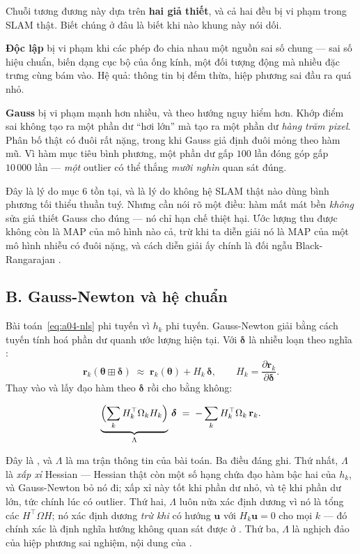 \documentclass[../../vslam.tex]{subfiles}
\begin{document}
\begin{cannho}
Chuỗi tương đương này dựa trên \textbf{hai giả thiết}, và cả hai đều bị vi phạm trong SLAM thật. Biết chúng ở đâu là biết khi nào khung này nói dối.

\textbf{Độc lập} bị vi phạm khi các phép đo chia nhau một nguồn sai số chung --- sai số hiệu chuẩn, biến dạng cục bộ của ống kính, một đối tượng động mà nhiều đặc trưng cùng bám vào. Hệ quả: thông tin bị đếm thừa, hiệp phương sai đầu ra quá nhỏ.

\textbf{Gauss} bị vi phạm mạnh hơn nhiều, và theo hướng nguy hiểm hơn. Khớp điểm sai không tạo ra một phần dư ``hơi lớn'' mà tạo ra một phần dư \emph{hàng trăm pixel}. Phân bố thật có đuôi rất nặng, trong khi Gauss giả định đuôi mỏng theo hàm mũ. Vì hàm mục tiêu bình phương, một phần dư gấp \(100\) lần đóng góp gấp \(10\,000\) lần --- \emph{một} outlier có thể thắng \emph{mười nghìn} quan sát đúng.

Đây là lý do mục 6 tồn tại, và là lý do không hệ SLAM thật nào dùng bình phương tối thiểu thuần tuý. Nhưng cần nói rõ một điều: hàm mất mát bền \emph{không} sửa giả thiết Gauss cho đúng --- nó chỉ hạn chế thiệt hại. Ước lượng thu được không còn là MAP của mô hình nào cả, trừ khi ta diễn giải nó là MAP của một mô hình nhiễu có đuôi nặng, và cách diễn giải ấy chính là đối ngẫu Black-Rangarajan \cite{blackrangarajan1996}.
\end{cannho}

\subsection{B. Gauss-Newton và hệ chuẩn}

Bài toán~\eqref{eq:a04-nls} phi tuyến vì \(h_k\) phi tuyến. Gauss-Newton giải bằng cách tuyến tính hoá phần dư quanh ước lượng hiện tại. Với \(\boldsymbol{\delta}\) là nhiễu loạn theo nghĩa :
\[
\mathbf{r}_k(\boldsymbol{\theta}\boxplus\boldsymbol{\delta}) \;\approx\; \mathbf{r}_k(\boldsymbol{\theta}) + H_k\,\boldsymbol{\delta},
\qquad H_k = \frac{\partial \mathbf{r}_k}{\partial\boldsymbol{\delta}}.
\]
Thay vào và lấy đạo hàm theo \(\boldsymbol{\delta}\) rồi cho bằng không:

\begin{equation}
\underbrace{\Bigl(\sum_k H_k^{\top}\Omega_k H_k\Bigr)}_{\Lambda}\,\boldsymbol{\delta}
\;=\; -\sum_k H_k^{\top}\Omega_k\,\mathbf{r}_k .
\label{eq:a04-normal}
\end{equation}

Đây là , và \(\Lambda\) là ma trận thông tin của bài toán. Ba điều đáng ghi. Thứ nhất, \(\Lambda\) là \emph{xấp xỉ} Hessian --- Hessian thật còn một số hạng chứa đạo hàm bậc hai của \(h_k\), và Gauss-Newton bỏ nó đi; xấp xỉ này tốt khi phần dư nhỏ, và tệ khi phần dư lớn, tức chính lúc có outlier. Thứ hai, \(\Lambda\) luôn nửa xác định dương vì nó là tổng các \(H^{\top}\Omega H\); nó xác định dương \emph{trừ khi} có hướng \(\mathbf{u}\) với \(H_k\mathbf{u}=0\) cho mọi \(k\) --- đó chính xác là định nghĩa hướng không quan sát được ở . Thứ ba, \(\Lambda\) là nghịch đảo của hiệp phương sai nghiệm, nội dung của .
\end{document}
